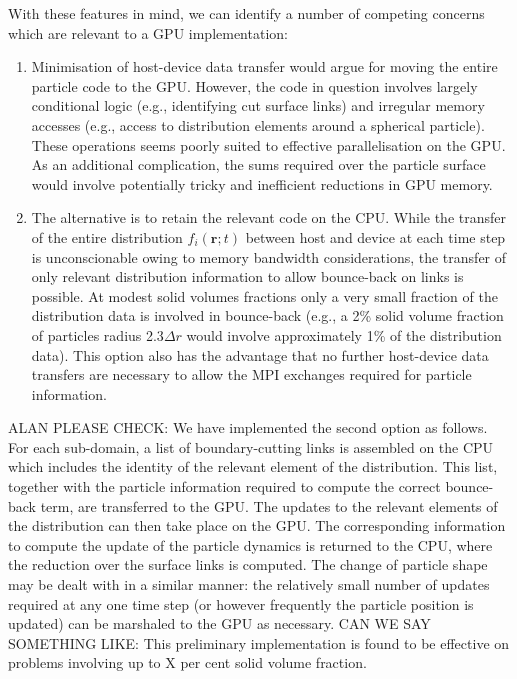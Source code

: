 With these features in mind, we can identify a number of competing
concerns which are relevant to a GPU implementation:
\begin{enumerate}
\item
Minimisation of host-device data transfer would argue for moving the
entire particle code to the GPU. However, the code in question involves
largely conditional logic (e.g., identifying cut surface links) and
irregular memory accesses (e.g., access to distribution elements around
a spherical particle). These operations seems poorly suited to effective
parallelisation on the GPU. As an additional complication, the sums
required over the particle surface would involve potentially tricky
and inefficient reductions in GPU memory.
\item
The alternative is to retain the relevant code on the CPU. While the
transfer of the entire distribution $f_i(\mathbf{r};t)$ between host
and device at each time step is unconscionable owing to memory bandwidth
considerations, the transfer of only relevant distribution information
to allow bounce-back on links is possible. At modest solid volumes
fractions only a very small fraction of the distribution data is
involved in bounce-back (e.g., a 2\% solid volume fraction of particles
radius 2.3$\Delta r$ would involve approximately 1\% of the distribution
data). This option also has the advantage that no further host-device
data transfers are necessary to allow the MPI exchanges required for
particle information.
\end{enumerate}

ALAN PLEASE CHECK:
We have implemented the second option as follows. For each sub-domain,
a list of boundary-cutting links is assembled on the CPU which includes
the identity of the relevant element of the distribution. This list,
together with the particle information required to compute the correct
bounce-back term, are transferred to the GPU. The updates to the relevant
elements of the distribution can then take place on the GPU. The
corresponding information to compute the update of the particle dynamics
is returned
to the CPU, where the reduction over the surface links is computed.
The change of particle shape may be dealt with in a similar manner:
the relatively small number of updates required at any one time step
(or however frequently the particle position is updated) can be
marshaled to the GPU as necessary.
CAN WE SAY SOMETHING LIKE: This preliminary implementation
is found to be effective on problems involving up to X per cent solid
volume fraction.

